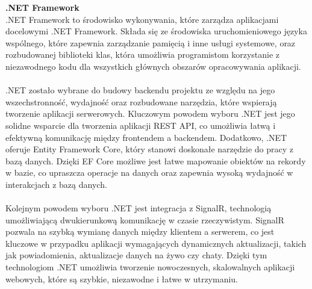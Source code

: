 \documentclass[twoside]{projektInzynierskiMS1}
\begin{document}
\noindent \textbf{.NET Framework}\\
.NET Framework to środowisko wykonywania, które zarządza aplikacjami docelowymi .NET Framework. Składa się ze środowiska uruchomieniowego języka wspólnego, które zapewnia zarządzanie pamięcią i inne usługi systemowe, oraz rozbudowanej biblioteki klas, która umożliwia programistom korzystanie z niezawodnego kodu dla wszystkich głównych obszarów opracowywania aplikacji.
\\\\
.NET zostało wybrane do budowy backendu projektu ze względu na jego wszechstronność, wydajność oraz rozbudowane narzędzia, które wspierają tworzenie aplikacji serwerowych. Kluczowym powodem wyboru .NET jest jego solidne wsparcie dla tworzenia aplikacji REST API, co umożliwia łatwą i efektywną komunikację między frontendem a backendem. Dodatkowo, .NET oferuje Entity Framework Core, który stanowi doskonałe narzędzie do pracy z bazą danych. Dzięki EF Core możliwe jest łatwe mapowanie obiektów na rekordy w bazie, co upraszcza operacje na danych oraz zapewnia wysoką wydajność w interakcjach z bazą danych.
\\\\
Kolejnym powodem wyboru .NET jest integracja z SignalR, technologią umożliwiającą dwukierunkową komunikację w czasie rzeczywistym. SignalR pozwala na szybką wymianę danych między klientem a serwerem, co jest kluczowe w przypadku aplikacji wymagających dynamicznych aktualizacji, takich jak powiadomienia, aktualizacje danych na żywo czy chaty. Dzięki tym technologiom .NET umożliwia tworzenie nowoczesnych, skalowalnych aplikacji webowych, które są szybkie, niezawodne i łatwe w utrzymaniu.
\\\\
\end{document}
